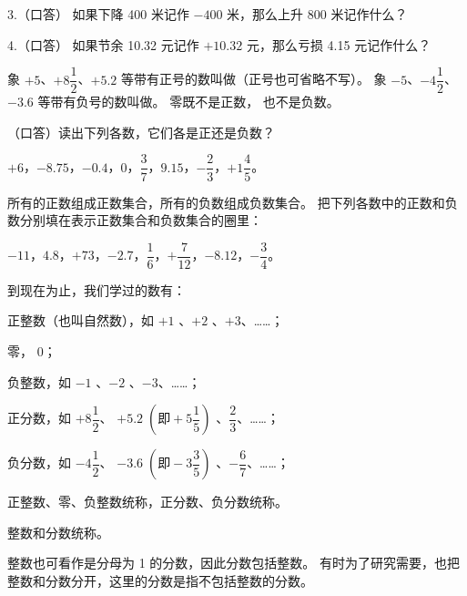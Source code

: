 3.（口答） 如果下降 400 米记作 $-400$ 米，那么上升 800 米记作什么？

4.（口答） 如果节余 10.32 元记作 $+10.32$ 元，那么亏损 4.15 元记作什么？

\jiange

\begin{enhancedline}
象 $+5$、$+8\dfrac{1}{2}$、$+5.2$ 等带有正号的数叫做（正号也可省略不写）。
象 $-5$、$-4\dfrac{1}{2}$、$-3.6$ 等带有负号的数叫做。
零既不是正数， 也不是负数。
\end{enhancedline}

\lianxi
（口答）读出下列各数，它们各是正还是负数？

\begin{enhancedline}
$+6$，$-8.75$，$-0.4$，$0$，$\dfrac{3}{7}$，$9.15$，$-\dfrac{2}{3}$，$+1\dfrac{4}{5}$。

\jiange

\liti[0] 所有的正数组成正数集合，所有的负数组成负数集合。
把下列各数中的正数和负数分别填在表示正数集合和负数集合的圈里：

$-11$，$4.8$，$+73$，$-2.7$，$\dfrac{1}{6}$，$+\dfrac{7}{12}$，$-8.12$，$-\dfrac{3}{4}$。
\end{enhancedline}

\begin{figure}[htbp]
    \centering
    
    \caption{}\label{fig:1-3}
\end{figure}

\jie
\begin{figure}[htbp]
    \centering
    
    \caption{}\label{fig:1-4}
\end{figure}

到现在为止，我们学过的数有：

正整数（也叫自然数），如 $+1$ 、$+2$ 、$+3$、……；

零， $0$；

负整数，如 $-1$ 、$-2$ 、$-3$、……；

\begin{enhancedline}
正分数，如 $+8\dfrac{1}{2}$、 $+5.2 \; \left( \text{即} +5\dfrac{1}{5} \right)$ 、$\dfrac{2}{3}$、……；

负分数，如 $-4\dfrac{1}{2}$、 $-3.6 \; \left( \text{即} -3\dfrac{3}{5} \right)$ 、$-\dfrac{6}{7}$、……；

正整数、零、负整数统称，正分数、负分数统称。
\end{enhancedline}

整数和分数统称。

\zhuyi 整数也可看作是分母为 1 的分数，因此分数包括整数。
有时为了研究需要，也把整数和分数分开，这里的分数是指不包括整数的分数。


\lianxi
\begin{xiaotis}
\begin{enhancedline}

\end{enhancedline}
\end{xiaotis}

